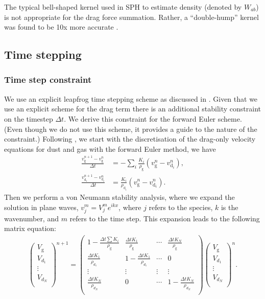 \documentclass[fleqn,usenatbib]{mnras}
\newcommand{\g}{\mathrm{g}}
\newcommand{\dd}{\mathrm{d}}
\begin{document}
The typical bell-shaped kernel used in SPH to estimate density (denoted by
\(W_{ab}\)) is not appropriate for the drag force summation. Rather, a
``double-hump'' kernel was found to be 10x more accurate
\citep{Laibe2012MNRAS.420.2345L}.

\subsection{Time stepping}

\subsubsection{Time step constraint}

We use an explicit leapfrog time stepping scheme as discussed in
\citet{Price2018PASA...35...31P}. Given that we use an explicit scheme for the
drag term there is an additional stability constraint on the timestep \(\Delta
t\). We derive this constraint for the forward Euler scheme. (Even though we do
not use this scheme, it provides a guide to the nature of the constraint.)
Following \citet{Laibe2012MNRAS.420.2345L, Laibe2014MNRAS.444.1940L}, we start
with the discretisation of the drag-only velocity equations for dust and gas
with the forward Euler method, we have
%
\begin{align}
   \frac{v_{\g}^{n+1} - v_{\g}^n}{\Delta t} &= - \sum_i \frac{K_i}{\rho_{\g}} \left(v_{\g}^n - v_{\dd_i}^n\right), \\
   \frac{v_{\dd_i}^{n+1} - v_{\dd_i}^n}{\Delta t} &= \frac{K_i}{\rho_{\dd_i}} \left(v_{\g}^n - v_{\dd_i}^n\right).
\end{align}
%
Then we perform a von Neumann stability analysis, where we expand the solution
in plane waves, \(v_j^m = V_j^m e^{i k x}\), where \(j\) refers to the species,
\(k\) is the wavenumber, and \(m\) refers to the time step. This expansion leads
to the following matrix equation:
%
\begin{align}
   \begin{pmatrix}
      V_{\g} \\ V_{d_1} \\ \vdots \\ V_{d_N} \\
   \end{pmatrix}^{n+1} =
   \begin{pmatrix}
      1 - \frac{\Delta t \sum K_i}{\rho_{\g}} & \frac{\Delta t K_1}{\rho_{\g}} & \cdots & \frac{\Delta t K_N}{\rho_{\g}} \\
      \frac{\Delta t K_1}{\rho_{d_1}} & 1 - \frac{\Delta t K_1}{\rho_{d_1}} & \cdots & 0 \\
      \vdots & \vdots & \vdots & \vdots \\
      \frac{\Delta t K_N}{\rho_{d_N}} & 0 & \cdots & 1 - \frac{\Delta t K_N}{\rho_{d_N}} \\
   \end{pmatrix}
   \begin{pmatrix}
      V_{\g} \\ V_{d_1} \\ \vdots \\ V_{d_N} \\
   \end{pmatrix}^{n}.
\end{align}
\end{document}
